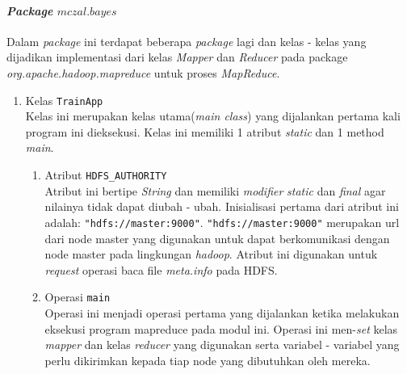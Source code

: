 \paragraph{\textit{Package} $mczal.bayes$}
Dalam \textit{package} ini terdapat beberapa \textit{package} lagi dan kelas - kelas yang dijadikan implementasi dari kelas \textit{Mapper} dan \textit{Reducer} pada package \textit{org.apache.hadoop.mapreduce} untuk proses \textit{MapReduce}.
\begin{enumerate}
	\item{Kelas \texttt{TrainApp}}\\
	Kelas ini merupakan kelas utama(\textit{main class}) yang dijalankan pertama kali program ini dieksekusi. Kelas ini memiliki 1 atribut \textit{static} dan 1 method \textit{main}.
	\begin{enumerate}
		\item Atribut \verb|HDFS_AUTHORITY| \\
		Atribut ini bertipe \textit{String} dan memiliki \textit{modifier} \textit{static} dan \textit{final} agar nilainya tidak dapat diubah - ubah. Inisialisasi pertama dari atribut ini adalah: \verb|"hdfs://master:9000"|. \verb|"hdfs://master:9000"| merupakan url dari node master yang digunakan untuk dapat berkomunikasi dengan node master pada lingkungan \textit{hadoop}. Atribut ini digunakan untuk \textit{request} operasi baca file \textit{meta.info} pada HDFS.
		
		\item Operasi \verb|main|\\
		Operasi ini menjadi operasi pertama yang dijalankan ketika melakukan eksekusi program mapreduce pada modul ini. Operasi ini men-\textit{set} kelas \textit{mapper} dan kelas \textit{reducer} yang digunakan serta variabel - variabel yang perlu dikirimkan kepada tiap node yang dibutuhkan oleh mereka.
	\end{enumerate}


\end{enumerate}

